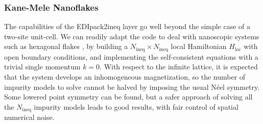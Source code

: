 \documentclass[edipack_sp.tex]{subfiles}
\begin{document}
\subsubsection{Kane-Mele Nanoflakes}
The capabilities of the EDIpack2ineq layer go well beyond the
simple case of a two-site unit-cell. We can readily adapt the
code to deal with nanoscopic systems such as hexagonal flakes
\cite{Valli2016PRB,Valli2018NL}, by building a
$N_\mathrm{ineq}\times N_\mathrm{ineq}$ local Hamiltonian 
$H_\mathrm{loc}$ with open boundary conditions, and implementing
the self-consistent equations with a trivial single momentum 
$k=0$. With respect to the infinite lattice, it is expected that
the system develops an inhomogeneous magnetization, so the number
of impurity models to solve cannot be halved by imposing the usual
Néel symmetry. Some lowered point symmetry can be found, but a 
safer approach of solving all the $N_\mathrm{ineq}$ impurity models
leads to good results, with fair control of spatial numerical noise.
\end{document}

